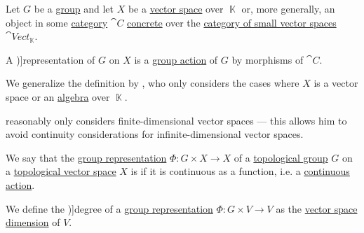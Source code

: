 \begin{definition}\label{def:group_representation}\mimprovised
  Let \( G \) be a \hyperref[def:group]{group} and let \( X \) be a \hyperref[def:vector_space]{vector space} over \( \BbbK \) or, more generally, an object in some \hyperref[def:category]{category} \( \cat{C} \) \hyperref[def:concrete_category]{concrete} over the \hyperref[def:vector_space]{category of small vector spaces} \( \cat{Vect}_\BbbK \).

  A \term[ru=линейное представление (\cite[def. 11.1.1]{Винберг2014КурсАлгебры})]{representation} of \( G \) on \( X \) is a \hyperref[def:group_action]{group action} of \( G \) by morphisms of \( \cat{C} \).
\end{definition}
\begin{comments}
  \item We generalize the definition by \textcite[def. 11.1.1]{Винберг2014КурсАлгебры}, who only considers the cases where \( X \) is a vector space or an \hyperref[def:algebra_over_ring]{algebra} over \( \BbbK \).

  \textcite[def. 3.1.1]{Steinberg2012RepresentationTheory} reasonably only considers finite-dimensional vector spaces --- this allows him to avoid continuity considerations for infinite-dimensional vector spaces.
\end{comments}

\begin{definition}\label{def:continuous_group_representation}
  We say that the \hyperref[def:group_representation]{group representation} \( \Phi: G \times X \to X \) of a \hyperref[def:topological_group]{topological group} \( G \) on a \hyperref[def:topological_vector_space]{topological vector space} \( X \) is  if it is continuous as a function, i.e. a \hyperref[def:continuous_monoid_action]{continuous action}.
\end{definition}

\begin{definition}\label{def:group_representation_degree}
  We define the \term[ru=размерность (представления) (\cite[def. 11.1.1]{Винберг2014КурсАлгебры})]{degree} of a \hyperref[def:group_representation]{group representation} \( \Phi: G \times V \to V \) as the \hyperref[def:vector_space_dimension]{vector space dimension} of \( V \).
\end{definition}

